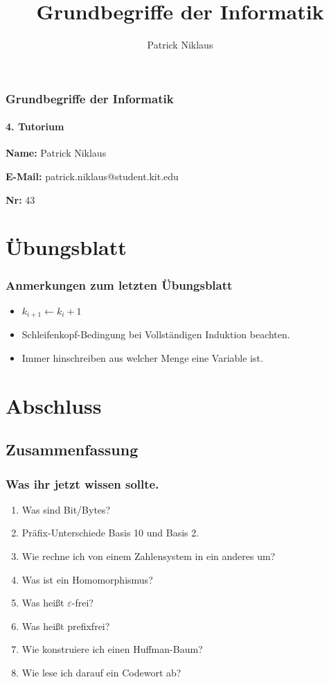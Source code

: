 \documentclass{beamer}
\title{Grundbegriffe der Informatik}
\author{Patrick Niklaus}
\begin{document}
\begin{frame}
  \frametitle{Grundbegriffe der Informatik}
  \framesubtitle{4. Tutorium}
  \begin{description}
    \item \textbf{Name:} Patrick Niklaus
    \item \textbf{E-Mail:} patrick.niklaus@student.kit.edu
    \item \textbf{Nr:} 43
  \end{description}
\end{frame}

\section{Übungsblatt}
\begin{frame}
  \frametitle{Anmerkungen zum letzten Übungsblatt}
  \begin{itemize}
    \item $k_{i+1} \longleftarrow k_i + 1$
    \item Schleifenkopf-Bedingung bei Vollständigen Induktion beachten.
    \item Immer hinschreiben aus welcher Menge eine Variable ist.
  \end{itemize}
\end{frame}






\section{Abschluss}
\subsection{Zusammenfassung}
\begin{frame}
  \frametitle{Was ihr jetzt wissen sollte.}
  \begin{enumerate}
    \item Was sind Bit/Bytes?
    \item Präfix-Unterschiede Basis 10 und Basis 2.
    \item Wie rechne ich von einem Zahlensystem in ein anderes um?
    \item Was ist ein Homomorphismus?
    \item Was heißt $\varepsilon$-frei?
    \item Was heißt prefixfrei?
    \item Wie konstruiere ich einen Huffman-Baum?
    \item Wie lese ich darauf ein Codewort ab?
  \end{enumerate}
\end{frame}
\end{document}
